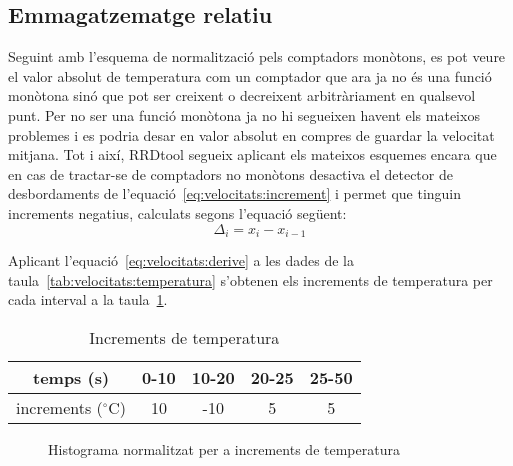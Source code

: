 \subsection{Emmagatzematge relatiu}

Seguint amb l'esquema de normalització pels comptadors monòtons, es pot veure el valor absolut de temperatura com un comptador que ara ja no és una funció monòtona sinó que pot ser creixent o decreixent arbitràriament en qualsevol punt. 
Per no ser una funció monòtona ja no hi segueixen havent els mateixos problemes i es podria desar en valor absolut en compres de guardar la velocitat mitjana. Tot i així, RRDtool segueix aplicant els mateixos esquemes encara que en cas de tractar-se de comptadors no monòtons desactiva el detector de desbordaments de l'equació~\ref{eq:velocitats:increment} i permet que tinguin increments negatius, calculats segons l'equació següent:
\begin{equation}\label{eq:velocitats:derive}
\Delta_i = 
x_i-x_{i-1} 
\end{equation}

Aplicant l'equació~\ref{eq:velocitats:derive} a les dades de la taula~\ref{tab:velocitats:temperatura} s'obtenen els increments de temperatura per cada interval a la taula~\ref{tab:velocitats:temperatura_relativa}. 

\begin{table}[tbp]
\centering
\begin{tabular}{c|cccc}
  temps (s) &  0-10 & 10-20 &20-25  & 25-50 \\ \hline
increments ($^\circ$C)& 10 & -10 & 5 & 5 
\end{tabular}
\caption{Increments de temperatura}
\label{tab:velocitats:temperatura_relativa}
\end{table}



\begin{figure}[tbp]
  \centering
  \caption{Histograma normalitzat per a increments de temperatura}
  \label{fig:velocitats:histograma_temperatura_relativa}
\end{figure}


